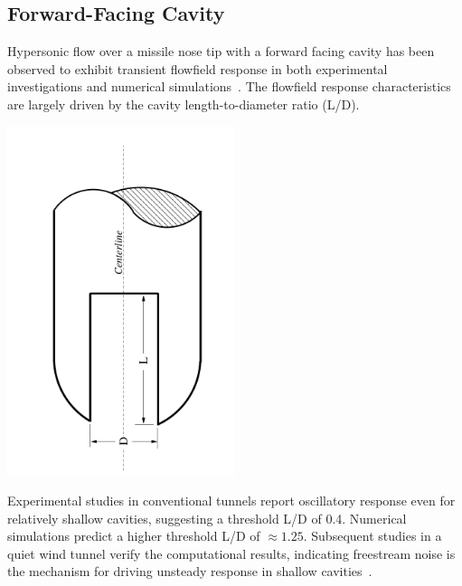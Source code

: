 \documentclass[compress,11pt]{beamer}
\begin{document}
\subsection*{Forward-Facing Cavity}
\frame
{
  \scriptsize
  Hypersonic flow over a missile nose tip with a forward facing cavity has been observed to exhibit transient flowfield response in both experimental investigations and numerical simulations~\cite{engblom_goldstein_AIAA-1996-354,silton_goldstein_JTHPHT}. The flowfield response characteristics are largely driven by the cavity length-to-diameter ratio (L/D).  
  \begin{center}
    \includegraphics[angle=270,width=0.5\textwidth]{figures/sphere_cavity/LD_2.0/schematic}
  \end{center}
  
  Experimental studies in conventional tunnels report oscillatory response even for relatively shallow cavities, suggesting a threshold L/D of 0.4. Numerical simulations predict a higher threshold L/D of $\approx 1.25$.  Subsequent studies in a quiet wind tunnel verify the computational results, indicating freestream noise is the mechanism for driving unsteady response in shallow cavities~\cite{engblom_goldstein_AIAA-1996-667}.
}
\end{document}
